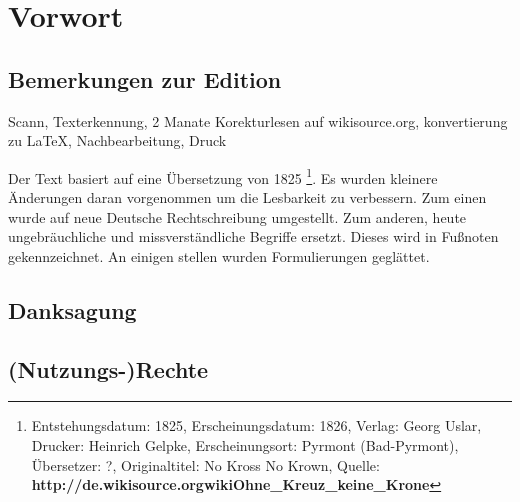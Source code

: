 \part{Vorwort}


\chapter{Bemerkungen zur Edition}
Scann, Texterkennung, 2 Manate Korekturlesen auf wikisource.org, konvertierung zu LaTeX, Nachbearbeitung, Druck

Der Text basiert auf eine Übersetzung von 1825 \footnote{Entstehungsdatum: 1825, Erscheinungsdatum: 1826, Verlag: Georg Uslar, Drucker: Heinrich Gelpke, Erscheinungsort: Pyrmont (Bad-Pyrmont), Übersetzer: ?, Originaltitel: No Kross No Krown, Quelle:
\textbf{http://de.wikisource.org\/wiki\/Ohne\_Kreuz\_keine\_Krone}}. Es wurden kleinere Änderungen daran vorgenommen um die Lesbarkeit zu verbessern. Zum einen wurde auf neue Deutsche Rechtschreibung umgestellt. Zum anderen, heute ungebräuchliche und missverständliche Begriffe ersetzt. Dieses wird in Fußnoten gekennzeichnet. An einigen stellen wurden Formulierungen geglättet.

\chapter{Danksagung}

\chapter{(Nutzungs-)Rechte}

